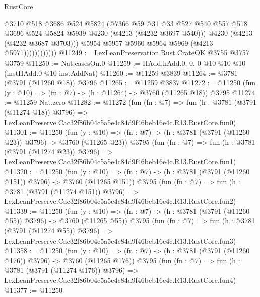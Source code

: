 \begin{lexlean}{RustCore}
\begin{coremodule}
                            @3710
                            @518
                            @3686
                            @524
                            @5824
                            (@7366
                              @59
                              @31
                              @33
                              @527
                              @540
                              @557
                              @518
                              @3696
                              @524
                              @5824
                              @5939
                              @4230
                              (@4213 (@4232 @3697 @540)))
                            @4230
                            (@4213 (@4232 @3687 @3703)))
                          @5954
                          @5957
                          @5960
                          @5964
                          @5969
                          (@4213 @5971))))))))))))
@11249 := LexLeanPreservation.Rust.CrateOK @3755 @3757 @3759
@11250 := Nat.casesOn.{0}
@11259 := HAdd.hAdd.{0, 0, 0} @10 @10 @10 (instHAdd.{0} @10 instAddNat)
@11260 := @11259 @3839
@11264 := @3781 (@3791 (@11260 @18)) @3796
@11265 := @11259 @3837
@11272 := @11250 (fun (y : @10) => (fn : @7) -> (h : @11264) -> @3760 (@11265 @18)) @3795
@11274 := @11259 Nat.zero
@11282 := @11272
    (fun (fn : @7) =>
    fun (h : @3781 (@3791 (@11274 @18)) @3796) =>
    LexLeanPreserve.Cac32f86b04c5a5e4c84d9f46beb16e4c.R13.RustCore.fun0)
@11301 := @11250
    (fun (y : @10) => (fn : @7) -> (h : @3781 (@3791 (@11260 @23)) @3796) -> @3760 (@11265 @23))
    @3795
    (fun (fn : @7) =>
    fun (h : @3781 (@3791 (@11274 @23)) @3796) =>
    LexLeanPreserve.Cac32f86b04c5a5e4c84d9f46beb16e4c.R13.RustCore.fun1)
@11320 := @11250
    (fun (y : @10) => (fn : @7) -> (h : @3781 (@3791 (@11260 @151)) @3796) -> @3760 (@11265 @151))
    @3795
    (fun (fn : @7) =>
    fun (h : @3781 (@3791 (@11274 @151)) @3796) =>
    LexLeanPreserve.Cac32f86b04c5a5e4c84d9f46beb16e4c.R13.RustCore.fun2)
@11339 := @11250
    (fun (y : @10) => (fn : @7) -> (h : @3781 (@3791 (@11260 @55)) @3796) -> @3760 (@11265 @55))
    @3795
    (fun (fn : @7) =>
    fun (h : @3781 (@3791 (@11274 @55)) @3796) =>
    LexLeanPreserve.Cac32f86b04c5a5e4c84d9f46beb16e4c.R13.RustCore.fun3)
@11358 := @11250
    (fun (y : @10) => (fn : @7) -> (h : @3781 (@3791 (@11260 @176)) @3796) -> @3760 (@11265 @176))
    @3795
    (fun (fn : @7) =>
    fun (h : @3781 (@3791 (@11274 @176)) @3796) =>
    LexLeanPreserve.Cac32f86b04c5a5e4c84d9f46beb16e4c.R13.RustCore.fun4)
@11377 := @11250

\end{coremodule}
\end{lexlean}
